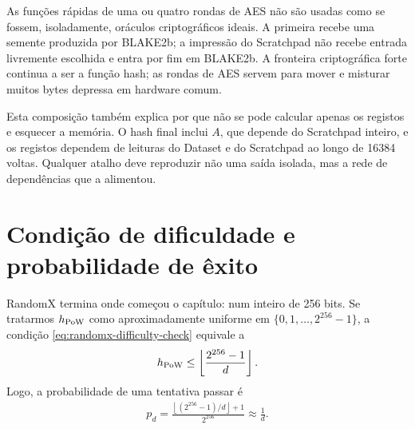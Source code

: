 \begin{center}
\end{center}

As funções rápidas de uma ou quatro rondas de AES não são usadas como se
fossem, isoladamente, oráculos criptográficos ideais. A primeira recebe uma
semente produzida por BLAKE2b; a impressão do Scratchpad não recebe entrada
livremente escolhida e entra por fim em BLAKE2b. A fronteira criptográfica
forte continua a ser a função hash; as rondas de AES servem para mover e
misturar muitos bytes depressa em hardware comum.

Esta composição também explica por que não se pode calcular apenas os
registos e esquecer a memória. O hash final inclui \(A\), que depende do
Scratchpad inteiro, e os registos dependem de leituras do Dataset e do
Scratchpad ao longo de 16384 voltas. Qualquer atalho deve reproduzir não uma
saída isolada, mas a rede de dependências que a alimentou.


\section{Condição de dificuldade e probabilidade de êxito}
\label{sec:randomx-lottery}

RandomX termina onde começou o capítulo: num inteiro de 256 bits. Se tratarmos
\(h_{\rm PoW}\) como aproximadamente uniforme em
\(\{0,1,\ldots,2^{256}-1\}\), a condição
\eqref{eq:randomx-difficulty-check} equivale a
\begin{align*}
 h_{\rm PoW}\leq
 \left\lfloor\frac{2^{256}-1}{d}\right\rfloor.
\end{align*}
Logo, a probabilidade de uma tentativa passar é
\begin{align}
 p_d=
 \frac{\left\lfloor(2^{256}-1)/d\right\rfloor+1}{2^{256}}
 \approx\frac1d.
 \label{eq:randomx-success-probability}
\end{align}

